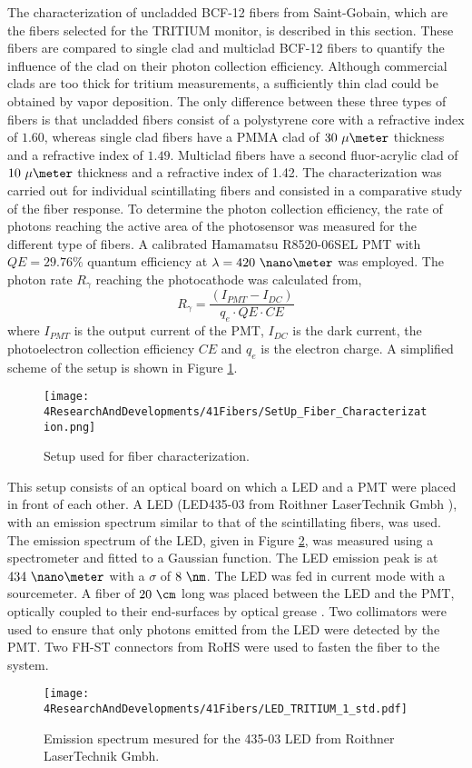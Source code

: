 The characterization of uncladded BCF-12 fibers from Saint-Gobain, which are the fibers selected for the TRITIUM monitor, is described in this section. These fibers are compared to single clad and multiclad BCF-12 fibers to quantify the influence of the clad on their photon collection efficiency. Although commercial clads are too thick for tritium measurements, a sufficiently thin clad could be obtained by vapor deposition. The only difference between these three types of fibers is that uncladded fibers consist of a polystyrene core with a refractive index of $1.60$, whereas single clad fibers have a PMMA clad of $30~\mu\meter$ thickness and a refractive index of $1.49$. Multiclad fibers have a second fluor-acrylic clad of $10~\mu\meter$ thickness  and a refractive index of 1.42. The characterization was carried out for individual scintillating fibers and consisted in a comparative study of the fiber response. To determine the photon collection efficiency, the rate of photons reaching the active area of the photosensor was measured for the different type of fibers. A calibrated Hamamatsu R8520-06SEL PMT with $QE=29.76\%$ quantum efficiency at $\lambda=420~\nano\meter$ was employed. The photon rate $R_{\gamma}$ reaching the photocathode was calculated from,
\begin{equation}
R_{\gamma} = \frac{\left( I_{PMT} - I_{DC} \right)}{q_e \cdot{} QE \cdot{} CE}
\label{eq:NumPhotonsFromIntensityPMT}
\end{equation}
where $I_{PMT}$ is the output current of the PMT, $I_{DC}$ is the dark current, the photoelectron collection efficiency $CE$ and $q_e$ is the electron charge. A simplified scheme of the setup is shown in Figure \ref{fig:SetUpFiberCharacterization}.
\begin{figure}[h]
\centering
\texttt{[image: 4ResearchAndDevelopments/41Fibers/SetUp\_Fiber\_Characterization.png]}
\caption{Setup used for fiber characterization.\label{fig:SetUpFiberCharacterization}}
\end{figure}
This setup consists of an optical board on which a LED and a PMT were placed in front of each other. A LED (LED435-03 from Roithner LaserTechnik Gmbh \cite{LEDRLT}), with an emission spectrum similar to that of the scintillating fibers, was used. The emission spectrum of the LED, given in Figure \ref{fig:LEDSpectrumTritium}, was measured using a spectrometer and fitted to a Gaussian function. The LED emission peak is at $434~\nano\meter$ with a $\sigma$ of $8~\nm$. The LED was fed in current mode with a sourcemeter. A fiber of $20~\cm$ long was placed between the LED and the PMT, optically coupled to their end-surfaces by optical grease \cite{OpticalGrease}. Two collimators were used to ensure that only photons emitted from the LED were detected by the PMT. Two FH-ST connectors from RoHS \cite{} were used to fasten the fiber to the system. 

\begin{figure}[h]
\centering
\texttt{[image: 4ResearchAndDevelopments/41Fibers/LED\_TRITIUM\_1\_std.pdf]}
\caption{Emission spectrum mesured for the 435-03 LED from Roithner LaserTechnik Gmbh.\label{fig:LEDSpectrumTritium}}
\end{figure}
